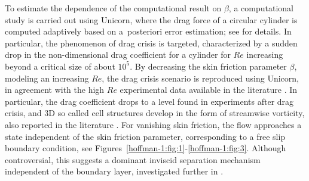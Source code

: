 To estimate the dependence of the computational result on $\beta$, a
computational study is carried out using Unicorn, where the drag force
of a circular cylinder is computed adaptively based on a~posteriori
error estimation; see \citet{HoffmanJansson2009} for details. In
particular, the phenomenon of drag crisis is targeted, characterized
by a sudden drop in the non-dimensional drag coefficient for a
cylinder for $Re$ increasing beyond a critical size of about
$10^5$. By decreasing the skin friction parameter $\beta$, modeling an
increasing $Re$, the drag crisis scenario is reproduced using Unicorn,
in agreement with the high $Re$ experimental data available in the
literature \citep{Zdravkovich2003}. In particular, the drag
coefficient drops to a level found in experiments after drag crisis,
and 3D so called cell structures develop in the form of streamwise
vorticity, also reported in the literature \citep{Zdravkovich2003}.
For vanishing skin friction, the flow approaches a state independent
of the skin friction parameter, corresponding to a free slip boundary
condition, see Figures~\ref{hoffman-1:fig:1}-\ref{hoffman-1:fig:3}. Although
controversial, this suggests a dominant inviscid separation mechanism
independent of the boundary layer, investigated further in
\citet{HoffmanJohnson2008b,HoffmanJansson2009}.

